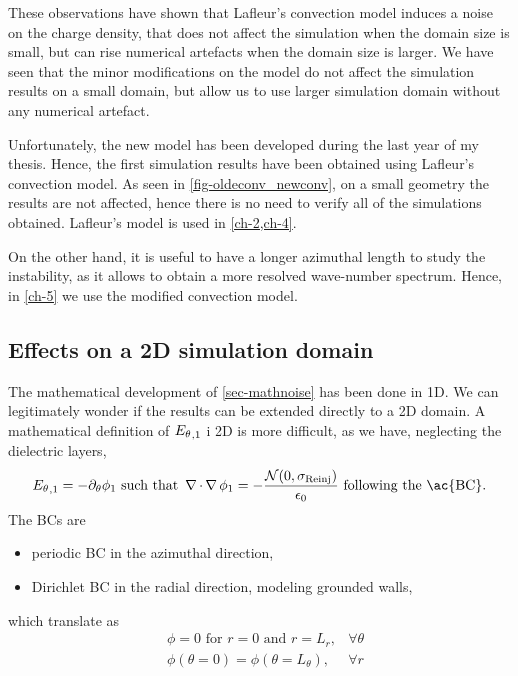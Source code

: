       These observations have shown that Lafleur's convection model induces a noise on the charge density, that does not affect the simulation when the domain size is small, but can rise numerical artefacts when the domain size is larger.
      We have seen that the minor modifications on the model do not affect the simulation results on a small domain, but allow us to use larger simulation domain without any numerical artefact.
      
      Unfortunately, the new model has been developed during the last year of my thesis.
      Hence, the first simulation results have been obtained using Lafleur's convection model.
      As seen in \cref{fig-oldeconv_newconv}, on a small geometry the results are not affected, hence there is no need to verify all of the simulations obtained.
      Lafleur's model is used in \cref{ch-2,ch-4}. 
      
      On the other hand, it is useful to have a longer azimuthal length to study the instability, as it allows to obtain a more resolved wave-number spectrum.
      Hence, in \cref{ch-5} we use the modified convection model.
          
    \subsection{Effects on a \acs{2D} simulation domain}
      
      The mathematical development of \cref{sec-mathnoise} has been done in \ac{1D}.
      We can legitimately wonder if the results  can be extended directly to a \ac{2D} domain.
      A mathematical definition of ${E_{\theta}}_{, 1}$ i \ac{2D} is more difficult, as we have, neglecting the dielectric layers,
      \begin{equation} \label{eq-aziE}
        \aziE_{, 1} = -\partial_{\theta} \phi_1 \text{ such that } \grad \cdot \grad \phi_1 = - \frac { \N(0, \stdconv)}{\epsilon_0} \text{ following the \ac{BC}}.
      \end{equation}
      The \ac{BC}s are
      \begin{itemize}
        \item periodic \ac{BC} in the azimuthal direction,
        \item Dirichlet \ac{BC} in the radial direction, modeling grounded walls,
      \end{itemize}
      which translate as
      \begin{align}
        &\phi = 0 \text{ for } r=0 \text{ and } r=L_r, &\forall \theta \label{eq-BC1} \\
        &\phi(\theta = 0)= \phi(\theta = L_{\theta}) , &\forall r \label{eq-BC2}
      \end{align}
      

